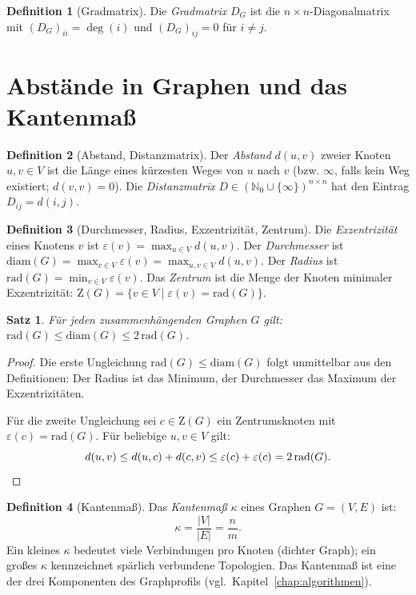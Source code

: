 ﻿\documentclass[a4paper,12pt,openany,oneside]{book}
\theoremstyle{definition}
\newtheorem{definition}{Definition}[chapter]
\theoremstyle{plain}
\newtheorem{satz}{Satz}[chapter]
\theoremstyle{remark}
\begin{document}
\begin{definition}[Gradmatrix]
  Die \emph{Gradmatrix} $D_G$ ist die $n \times n$-Diagonalmatrix mit
  $(D_G)_{ii} = \deg(i)$ und $(D_G)_{ij} = 0$ f\"ur $i \neq j$.
\end{definition}

\section{Abst\"ande in Graphen und das Kantenma\ss{}}

\begin{definition}[Abstand, Distanzmatrix]
  Der \emph{Abstand} $d(u,v)$ zweier Knoten $u, v \in V$ ist die L\"ange
  eines k\"urzesten Weges von $u$ nach $v$ (bzw. $\infty$, falls kein Weg
  existiert; $d(v,v) = 0$). Die \emph{Distanzmatrix}
  $D \in (\mathbb{N}_0 \cup \{\infty\})^{n \times n}$ hat den Eintrag
  $D_{ij} = d(i,j)$.
\end{definition}

\begin{definition}[Durchmesser, Radius, Exzentrizit\"at, Zentrum]
  Die \emph{Exzentrizit\"at} eines Knotens $v$ ist
  $\varepsilon(v) = \max_{u \in V} d(u,v)$.
  Der \emph{Durchmesser} ist $\mathrm{diam}(G) = \max_{v \in V} \varepsilon(v)
  = \max_{u,v \in V} d(u,v)$.
  Der \emph{Radius} ist $\mathrm{rad}(G) = \min_{v \in V} \varepsilon(v)$.
  Das \emph{Zentrum} ist die Menge der Knoten minimaler Exzentrizit\"at:
  $\mathrm{Z}(G) = \{v \in V \mid \varepsilon(v) = \mathrm{rad}(G)\}$.
\end{definition}

\begin{satz}
  F\"ur jeden zusammenh\"angenden Graphen $G$ gilt:
  $\mathrm{rad}(G) \leq \mathrm{diam}(G) \leq 2\,\mathrm{rad}(G)$.
\end{satz}

\begin{proof}
  Die erste Ungleichung $\mathrm{rad}(G) \leq \mathrm{diam}(G)$ folgt
  unmittelbar aus den Definitionen: Der Radius ist das Minimum, der
  Durchmesser das Maximum der Exzentrizit\"aten.

  F\"ur die zweite Ungleichung sei $c \in \mathrm{Z}(G)$ ein Zentrumsknoten
  mit $\varepsilon(c) = \mathrm{rad}(G)$. F\"ur beliebige $u, v \in V$ gilt:
  \[
    d(u,v) \leq d(u,c) + d(c,v) \leq \varepsilon(c) + \varepsilon(c)
            = 2\,\mathrm{rad}(G). \qedhere
  \]
\end{proof}

\begin{definition}[Kantenma\ss{}]
  \label{def:kantenmass}
  Das \emph{Kantenma\ss{}} $\kappa$ eines Graphen $G = (V,E)$ ist:
  \[
    \kappa = \frac{|V|}{|E|} = \frac{n}{m}.
  \]
  Ein kleines $\kappa$ bedeutet viele Verbindungen pro Knoten (dichter Graph);
  ein gro\ss{}es $\kappa$ kennzeichnet sp\"arlich verbundene Topologien. Das
  Kantenma\ss{} ist eine der drei Komponenten des Graphprofils
  (vgl.~Kapitel~\ref{chap:algorithmen}).
\end{definition}
\end{document}
